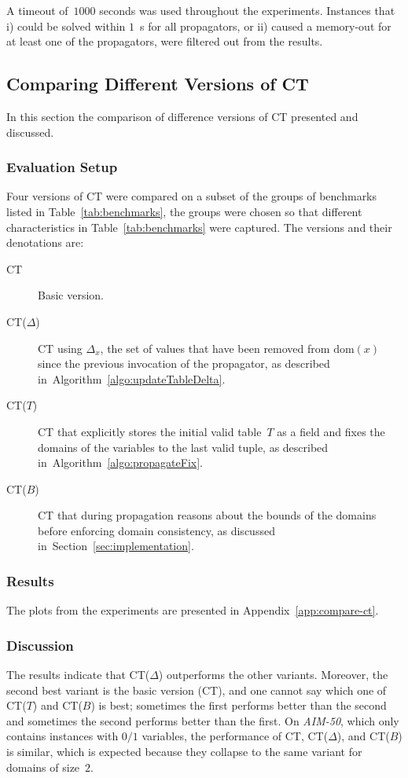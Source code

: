 \documentclass[a4paper,11pt]{article}
\newcommand{\Secref}[1]{Section~\ref{#1}}
\newcommand{\Algoref}[1]{Algorithm~\ref{#1}}
\newcommand{\Dom}[1]{\text{dom}({#1})}
\numberwithin{equation}{section}
\begin{document}
A timeout of~$1000$ seconds was used throughout the experiments.
Instances that i) could be solved within $1$~s for all propagators, or
ii) caused a memory-out for at least one of the propagators,
were filtered out from the results.

\subsection{Comparing Different Versions of CT}
\label{sec:compare}

In this section the comparison of difference versions of CT
presented and discussed.

\subsubsection{Evaluation Setup}
Four versions of CT were compared on a subset of the groups of benchmarks
listed in Table~\ref{tab:benchmarks}, the groups were chosen so 
that different characteristics in Table~\ref{tab:benchmarks} were captured.
The versions and their denotations are:

\begin{description}
  \item[CT] Basic version.
  \item[CT($\Delta$)] CT using $\Delta_x$, the set
    of values that have been removed from $\Dom{x}$
    since the previous invocation of the propagator,
    as described in~\Algoref{algo:updateTableDelta}.
  \item[CT($T$)] CT that explicitly stores the initial valid table~$T$ as
    a field and
    fixes the domains of the variables to the last valid tuple, as described
    in~\Algoref{algo:propagateFix}.
  \item[CT($B$)] CT that during propagation reasons about the bounds of the domains before
    enforcing domain consistency, as discussed in~\Secref{sec:implementation}.
\end{description}

\subsubsection{Results}

The plots from the experiments are presented in Appendix~\ref{app:compare-ct}.

\subsubsection{Discussion}
The results indicate that CT($\Delta$) outperforms the other variants.
Moreover, the second best variant is the basic version (CT), and one
cannot say which one of CT($T$) and CT($B$) is best; sometimes the first
performs better than the second and sometimes the second performs better
than the first.
On \emph{AIM-50}, which only contains instances
with $0/1$ variables, the performance of CT, CT($\Delta$), and CT($B$) is
similar, which is expected because they collapse to the same variant
for domains of size~$2$.
\end{document}
